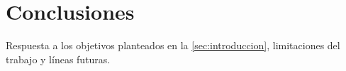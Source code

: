 \section{Conclusiones}
\label{sec:conclusiones}

Respuesta a los objetivos planteados en la \cref{sec:introduccion}, limitaciones del
trabajo y líneas futuras.
